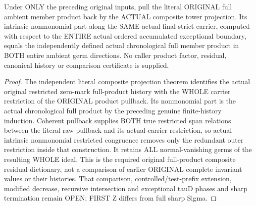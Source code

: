 \begin{theorem}
\label{hir:sharp-actual-original-composite-product-all-exceptional-residual}
\leanok
Under ONLY the preceding original inputs, pull the literal ORIGINAL full
ambient member product back by the ACTUAL composite tower projection.
Its intrinsic nonmonomial part along the SAME actual final strict
carrier, computed with respect to the ENTIRE actual ordered accumulated
exceptional boundary, equals the independently defined actual
chronological full member product in BOTH entire ambient germ directions.
No caller product factor, residual, canonical history or comparison
certificate is supplied.
\end{theorem}
\begin{proof}
The independent literal composite projection theorem identifies the
actual original restricted zero-mark full-product history with the WHOLE
carrier restriction of the ORIGINAL product pullback. Its nonmonomial
part is the actual chronological full product by the preceding genuine
finite-history induction. Coherent pullback supplies BOTH true restricted
span relations between the literal raw pullback and its actual carrier
restriction, so actual intrinsic nonmonomial restricted congruence removes
only the redundant outer restriction inside that construction. It retains
ALL normal-vanishing germs of the resulting WHOLE ideal. This is the
required original full-product composite residual dictionary, not a
comparison of earlier ORIGINAL complete invariant values or their
histories. That comparison, controlled/test-prefix extension, modified
decrease, recursive intersection and exceptional tauD phases and sharp
termination remain OPEN; FIRST Z differs from full sharp Sigma.
\end{proof}
